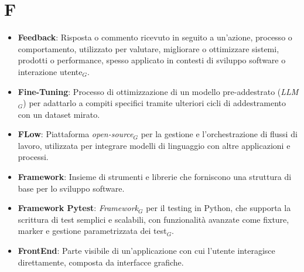 \section{F}
\begin{itemize}
    \item \textbf{Feedback}: Risposta o commento ricevuto in seguito a un'azione, processo o comportamento, utilizzato per valutare, migliorare o ottimizzare sistemi, prodotti o performance, spesso applicato in contesti di sviluppo software o interazione utente$_G$.
    \item \textbf{Fine-Tuning}: Processo di ottimizzazione di un modello pre-addestrato (\textit{LLM}$_G$) per adattarlo a compiti specifici tramite ulteriori cicli di addestramento con un dataset mirato.
    \item \textbf{FLow}: Piattaforma \textit{open-source}$_G$ per la gestione e l'orchestrazione di flussi di lavoro, utilizzata per integrare modelli di linguaggio con altre applicazioni e processi.
    \item \textbf{Framework}: Insieme di strumenti e librerie che forniscono una struttura di base per lo sviluppo software.
    \item \textbf{Framework Pytest}:  \textit{Framework}$_G$ per il testing in Python, che supporta la scrittura di test semplici e scalabili, con funzionalità avanzate come fixture, marker e gestione parametrizzata dei test$_G$.
    
    \item \textbf{FrontEnd}: Parte visibile di un'applicazione con cui l'utente interagisce direttamente, composta da interfacce grafiche.
\end{itemize}
